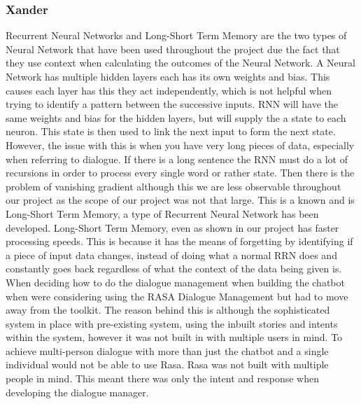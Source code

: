 \documentclass[hidelinks, 11pt]{article}
\begin{document}
\subsubsection{Xander}
\label{subsec:xander}
Recurrent Neural Networks and Long-Short Term Memory are the two types of Neural Network that have been used throughout the project due the fact that they use context when calculating the outcomes of the Neural Network. A Neural Network has multiple hidden layers each has its own weights and bias. This causes each layer has this they act independently, which is not helpful when trying to identify a pattern between the successive inputs. RNN will have the same weights and bias for the hidden layers, but will supply the a state to each neuron. This state is then used to link the next input to form the next state.
However, the issue with this is when you have very long pieces of data, especially when referring to dialogue. If there is a long sentence the RNN must do a lot of recursions in order to process every single word or rather state. Then there is the problem of vanishing gradient although this we are less observable throughout our project as the scope of our project was not that large. This is a known and is Long-Short Term Memory, a type of Recurrent Neural Network has been developed.
Long-Short Term Memory, even as shown in our project has faster processing speeds. This is because it has the means of forgetting by identifying if a piece of input data changes, instead of doing what a normal RRN does and constantly goes back regardless of what the context of the data being given is.
When deciding how to do the dialogue management when building the chatbot when were considering using the RASA Dialogue Management but had to move away from the toolkit. The reason behind this is although the sophisticated system in place with pre-existing system, using the inbuilt stories and intents within the system, however it was not built in with multiple users in mind. To achieve multi-person dialogue with more than just the chatbot and a single individual would not be able to use Rasa. Rasa was not built with multiple people in mind. This meant there was only the intent and response when developing the dialogue manager.
\end{document}
